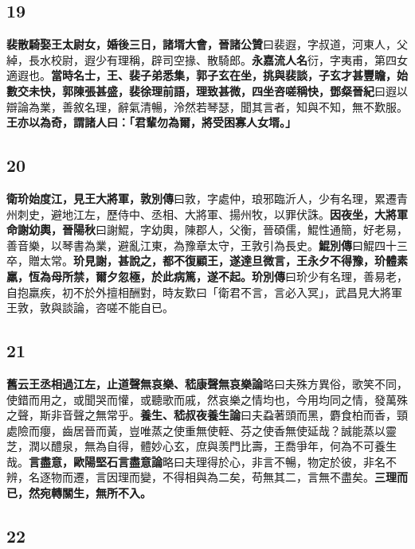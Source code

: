 \subsection*{19}

\textbf{裴散騎娶王太尉女，婚後三日，諸壻大會，}{\footnotesize \textbf{晉諸公贊}曰裴遐，字叔道，河東人，父綽，長水校尉，遐少有理稱，辟司空掾、散騎郎。\textbf{永嘉流人名}衍，字夷甫，第四女適遐也。}\textbf{當時名士，王、裴子弟悉集，郭子玄在坐，挑與裴談，子玄才甚豐瞻，始數交未快，郭陳張甚盛，裴徐理前語，理致甚微，四坐咨嗟稱快，}{\footnotesize \textbf{鄧粲晉紀}曰遐以辯論為業，善敘名理，辭氣清暢，泠然若琴瑟，聞其言者，知與不知，無不歎服。}\textbf{王亦以為奇，謂諸人曰：「君輩勿為爾，將受困寡人女壻。」}

\subsection*{20}

\textbf{衛玠始度江，見王大將軍，}{\footnotesize \textbf{敦別傳}曰敦，字處仲，琅邪臨沂人，少有名理，累遷青州刺史，避地江左，歷侍中、丞相、大將軍、揚州牧，以罪伏誅。}\textbf{因夜坐，大將軍命謝幼輿，}{\footnotesize \textbf{晉陽秋}曰謝鯤，字幼輿，陳郡人，父衡，晉碩儒，鯤性通簡，好老易，善音樂，以琴書為業，避亂江東，為豫章太守，王敦引為長史。\textbf{鯤別傳}曰鯤四十三卒，贈太常。}\textbf{玠見謝，甚說之，都不復顧王，遂達旦微言，王永夕不得豫，玠體素羸，恆為母所禁，爾夕忽極，於此病篤，遂不起。}{\footnotesize \textbf{玠別傳}曰玠少有名理，善易老，自抱羸疾，初不於外擅相酬對，時友歎曰「衛君不言，言必入冥」，武昌見大將軍王敦，敦與談論，咨嗟不能自已。}

\subsection*{21}

\textbf{舊云王丞相過江左，止道聲無哀樂、}{\footnotesize \textbf{嵇康聲無哀樂論}略曰夫殊方異俗，歌笑不同，使錯而用之，或聞哭而懽，或聽歌而戚，然哀樂之情均也，今用均同之情，發萬殊之聲，斯非音聲之無常乎。}\textbf{養生、}{\footnotesize \textbf{嵇叔夜養生論}曰夫蝨著頭而黑，麝食柏而香，頸處險而癭，齒居晉而黃，豈唯蒸之使重無使輊、芬之使香無使延哉？誠能蒸以靈芝，潤以醴泉，無為自得，體妙心玄，庶與羡門比壽，王喬爭年，何為不可養生哉。}\textbf{言盡意，}{\footnotesize \textbf{歐陽堅石言盡意論}略曰夫理得於心，非言不暢，物定於彼，非名不辨，名逐物而遷，言因理而變，不得相與為二矣，苟無其二，言無不盡矣。}\textbf{三理而已，然宛轉關生，無所不入。}

\subsection*{22}

